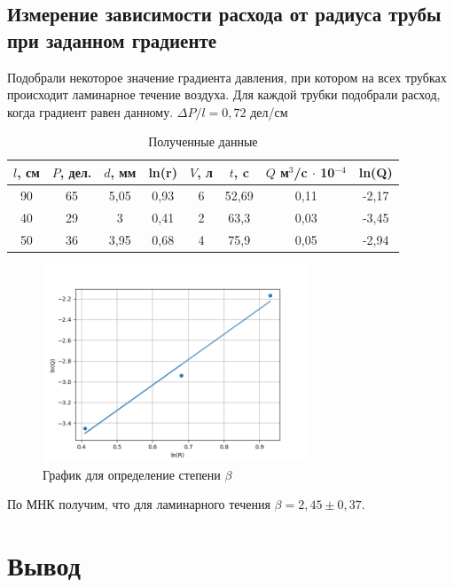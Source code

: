 \documentclass[a4paper, 12pt]{article}
\begin{document}
    \subsection*{Измерение зависимости расхода от радиуса трубы при заданном градиенте}

    Подобрали некоторое значение градиента давления, при котором на всех трубках происходит ламинарное течение воздуха. Для каждой трубки подобрали расход, когда градиент равен данному. $\Delta P / l = 0,72$ дел/см

    \begin{table}[!ht]
        \centering
        \begin{tabular}{|c|c|c|c|c|c|c|c|}
        \hline
            $l$, см & $P$, дел. & $d$, мм & ln(r) & $V$, л & $t$, c & $Q$ м$^3$/c $\cdot$ 10$^{-4}$ & ln(Q) \\ \hline
            90 & 65 & 5,05 & 0,93 & 6 & 52,69 & 0,11 & -2,17 \\ \hline
            40 & 29 & 3 & 0,41 & 2 & 63,3 & 0,03 & -3,45 \\ \hline
            50 & 36 & 3,95 & 0,68 & 4 & 75,9 & 0,05 & -2,94 \\ \hline
        \end{tabular}
        \caption{Полученные данные}
    \end{table}
    
    \begin{figure}[!ht]
        \centering
        \includegraphics[width=0.7\textwidth]{ln.png}
        \caption{График для определение степени $\beta$ }
    \end{figure}

По МНК получим, что для ламинарного течения $ \beta = 2,45 \pm 0,37 $.

\section{Вывод}
\end{document}
